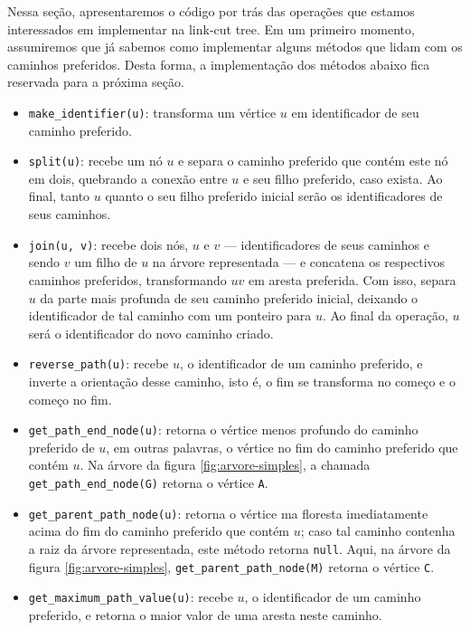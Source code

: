 Nessa seção, apresentaremos o código por trás das operações que estamos interessados em implementar na link-cut tree. Em um primeiro momento, assumiremos que já sabemos como implementar alguns métodos que lidam com os caminhos preferidos. Desta forma, a implementação dos métodos abaixo fica reservada para a próxima seção.

\begin{itemize}
    \item \texttt{make\_identifier(u)}: transforma um vértice $u$ em identificador de seu caminho preferido.
    \item \texttt{split(u)}: recebe um nó $u$ e separa o caminho preferido que contém este nó em dois, quebrando a conexão entre $u$ e seu filho preferido, caso exista. Ao final, tanto $u$ quanto o seu filho preferido inicial serão os identificadores de seus caminhos.
    \item \texttt{join(u, v)}: recebe dois nós, $u$ e $v$ --- identificadores de seus caminhos e sendo $v$ um filho de $u$ na árvore representada --- e concatena os respectivos caminhos preferidos, transformando $uv$ em aresta preferida. Com isso, separa $u$ da parte mais profunda de seu caminho preferido inicial, deixando o identificador de tal caminho com um ponteiro para $u$. Ao final da operação, $u$ será o identificador do novo caminho criado.
    \item \texttt{reverse\_path(u)}: recebe $u$, o identificador de um caminho preferido, e inverte a orientação desse caminho, isto é, o fim se transforma no começo e o começo no fim.
    \item \texttt{get\_path\_end\_node(u)}: retorna o vértice menos profundo do caminho preferido de $u$, em outras palavras, o vértice no fim do caminho preferido que contém $u$. Na árvore da figura \ref{fig:arvore-simples}, a chamada \texttt{get\_path\_end\_node(G)} retorna o vértice \texttt{A}.
    \item \texttt{get\_parent\_path\_node(u)}: retorna o vértice ma floresta imediatamente acima do fim do caminho preferido que contém $u$; caso tal caminho contenha a raiz da árvore representada, este método retorna \texttt{null}. Aqui, na árvore da figura \ref{fig:arvore-simples}, \texttt{get\_parent\_path\_node(M)} retorna o vértice \texttt{C}.
    \item \texttt{get\_maximum\_path\_value(u)}: recebe $u$, o identificador de um caminho preferido, e retorna o maior valor de uma aresta neste caminho.
\end{itemize}


